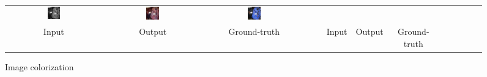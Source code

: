 \documentclass[10pt,twocolumn,letterpaper]{article}
\def\acollumsize{0.14\textwidth}
\begin{document}
\begin{figure}[t!]
\begin{center}
\begin{tabular}{ ccccccccccccc }
\includegraphics[width=\acollumsize]{img/result/28_in.JPEG}&
\includegraphics[width=\acollumsize]{img/result/28.png}&
\includegraphics[width=\acollumsize]{img/result/28_gt.JPEG}& \\

Input & Output & Ground-truth &&& Input & Output & Ground-truth \\

\end{tabular}
\vspace{-2mm}
\caption{\small Image colorization}
\label{fig:result}
\end{center}
\end{figure}
\end{document}
